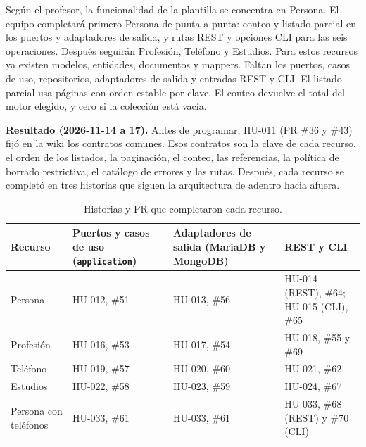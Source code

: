 \documentclass[11pt,a4paper]{article}
\begin{document}
Según el profesor, la funcionalidad de la plantilla se concentra en Persona.
El equipo completará primero Persona de punta a punta: conteo y listado parcial
en los puertos y adaptadores de salida, y rutas REST y opciones CLI para las seis
operaciones. Después seguirán Profesión, Teléfono y Estudios. Para estos recursos
ya existen modelos, entidades, documentos y mappers. Faltan los puertos, casos de
uso, repositorios, adaptadores de salida y entradas REST y CLI. El listado parcial
usa páginas con orden estable por clave. El conteo devuelve el total del motor
elegido, y cero si la colección está vacía.

\textbf{Resultado (2026-11-14 a 17).} Antes de programar, HU-011 (PR \#36 y
\#43) fijó en la wiki los contratos comunes. Esos contratos son la clave de cada
recurso, el orden de los listados, la paginación, el conteo, las referencias,
la política de borrado restrictiva, el catálogo de errores y las rutas. Después,
cada recurso se completó en tres historias que siguen la arquitectura de adentro
hacia afuera.

\begin{table}[H]
\centering\small
\begin{tabularx}{\textwidth}{@{}p{2.2cm}>{\raggedright\arraybackslash}X>{\raggedright\arraybackslash}X>{\raggedright\arraybackslash}X@{}}
\toprule
\textbf{Recurso}&\textbf{Puertos y casos de uso (\texttt{application})}&\textbf{Adaptadores de salida (MariaDB y MongoDB)}&\textbf{REST y CLI}\\\midrule
Persona&HU-012, \#51&HU-013, \#56&HU-014 (REST), \#64; HU-015 (CLI), \#65\\
Profesión&HU-016, \#53&HU-017, \#54&HU-018, \#55 y \#69\\
Teléfono&HU-019, \#57&HU-020, \#60&HU-021, \#62\\
Estudios&HU-022, \#58&HU-023, \#59&HU-024, \#67\\
Persona con teléfonos&HU-033, \#61&HU-033, \#61&HU-033, \#68 (REST) y \#70 (CLI)\\
\bottomrule
\end{tabularx}
\caption{Historias y PR que completaron cada recurso.}
\end{table}
\end{document}
